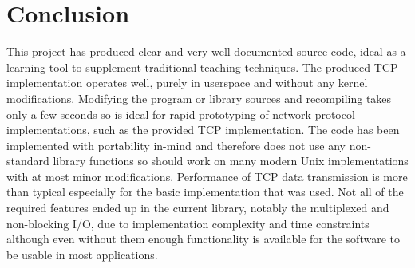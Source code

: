 
\onecolumn

\chapter{Conclusion}


This project has produced clear and very well documented source code, ideal as a learning tool to supplement traditional teaching techniques. The produced TCP implementation operates well, purely in userspace and without any kernel modifications. Modifying the program or library sources and recompiling takes only a few seconds so is ideal for rapid prototyping of network protocol implementations, such as the provided TCP implementation. The code has been implemented with portability in-mind and therefore does not use any non-standard library functions so should work on many modern Unix implementations with at most minor modifications. Performance of TCP data transmission is more than typical especially for the basic implementation that was used. Not all of the required features ended up in the current library, notably the multiplexed and non-blocking I/O, due to implementation complexity and time constraints although even without them enough functionality is available for the software to be usable in most applications.

\twocolumn
